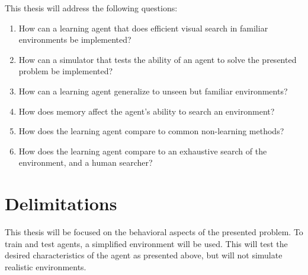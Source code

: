 This thesis will address the following questions:

\begin{enumerate}
  \item How can a learning agent that does efficient visual search in familiar environments be implemented?
  \item How can a simulator that tests the ability of an agent to solve the presented problem be implemented?
  \item How can a learning agent generalize to unseen but familiar environments?
  \item How does memory affect the agent's ability to search an environment?
  \item How does the learning agent compare to common non-learning methods?
  \item How does the learning agent compare to an exhaustive search of the environment, and a human searcher?
\end{enumerate}


\section{Delimitations}
\label{sec:delimitations}

This thesis will be focused on the behavioral aspects of the presented problem. To train and test agents, a simplified environment will be used. This will test the desired characteristics of the agent as presented above, but will not simulate realistic environments.





